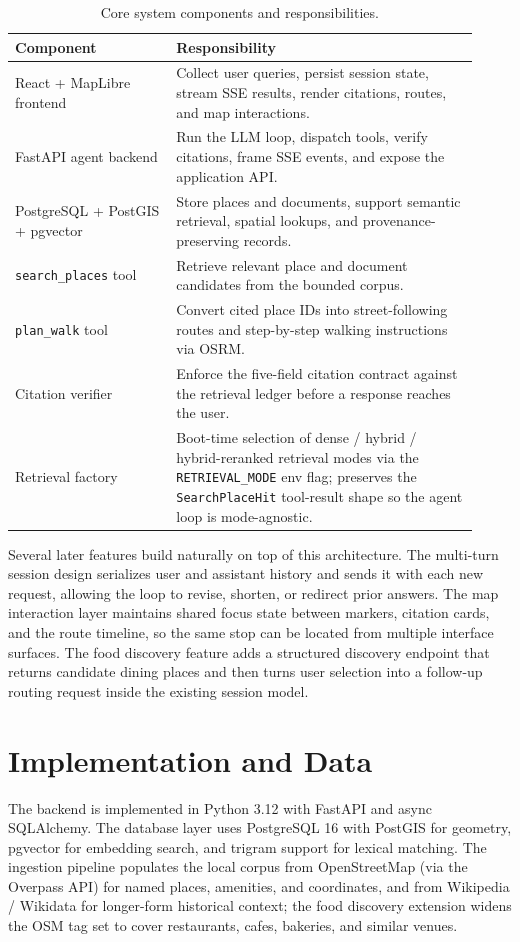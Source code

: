 \documentclass[sigconf,nonacm]{acmart}
\begin{document}
\begin{table}[t]
  \caption{Core system components and responsibilities.}
  \label{tab:components}
  \begin{tabular}{p{0.32\linewidth} p{0.60\linewidth}}
    \toprule
    Component & Responsibility \\
    \midrule
    React + MapLibre frontend & Collect user queries, persist session state, stream SSE results, render citations, routes, and map interactions. \\
    FastAPI agent backend & Run the LLM loop, dispatch tools, verify citations, frame SSE events, and expose the application API. \\
    PostgreSQL + PostGIS + pgvector & Store places and documents, support semantic retrieval, spatial lookups, and provenance-preserving records. \\
    \texttt{search\_places} tool & Retrieve relevant place and document candidates from the bounded corpus. \\
    \texttt{plan\_walk} tool & Convert cited place IDs into street-following routes and step-by-step walking instructions via OSRM. \\
    Citation verifier & Enforce the five-field citation contract against the retrieval ledger before a response reaches the user. \\
    Retrieval factory & Boot-time selection of dense / hybrid / hybrid-reranked retrieval modes via the \texttt{RETRIEVAL\_MODE} env flag; preserves the \texttt{SearchPlaceHit} tool-result shape so the agent loop is mode-agnostic. \\
    \bottomrule
  \end{tabular}
\end{table}

Several later features build naturally on top of this architecture. The multi-turn session design serializes user and assistant history and sends it with each new request, allowing the loop to revise, shorten, or redirect prior answers. The map interaction layer maintains shared focus state between markers, citation cards, and the route timeline, so the same stop can be located from multiple interface surfaces. The food discovery feature adds a structured discovery endpoint that returns candidate dining places and then turns user selection into a follow-up routing request inside the existing session model.

\section{Implementation and Data}
The backend is implemented in Python 3.12 with FastAPI and async SQLAlchemy. The database layer uses PostgreSQL 16 with PostGIS for geometry, pgvector for embedding search, and trigram support for lexical matching. The ingestion pipeline populates the local corpus from OpenStreetMap (via the Overpass API) for named places, amenities, and coordinates, and from Wikipedia / Wikidata for longer-form historical context; the food discovery extension widens the OSM tag set to cover restaurants, cafes, bakeries, and similar venues.
\end{document}
